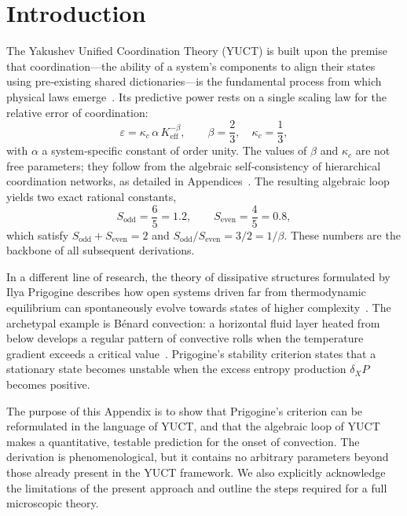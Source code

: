\documentclass[12pt,a4paper]{article}
\begin{document}
	\newpage
	\tableofcontents
	\newpage
	
	\section{Introduction}
	
	The Yakushev Unified Coordination Theory (YUCT) is built upon the premise that coordination—the ability of a system's components to align their states using pre‑existing shared dictionaries—is the fundamental process from which physical laws emerge~\cite{Yakushev2026}.  Its predictive power rests on a single scaling law for the relative error of coordination:
	\begin{equation}\label{eq:universal}
		\varepsilon = \kappa_c\,\alpha\, K_{\mathrm{eff}}^{-\beta},\qquad 
		\beta = \frac{2}{3},\quad \kappa_c = \frac{1}{3},
	\end{equation}
	with \(\alpha\) a system‑specific constant of order unity.  The values of \(\beta\) and \(\kappa_c\) are not free parameters; they follow from the algebraic self‑consistency of hierarchical coordination networks, as detailed in Appendices~\cite{AppendixY, AppendixL, AppendixFerra, AppendixAF}.  The resulting algebraic loop yields two exact rational constants,
	\begin{equation}\label{eq:S-constants}
		S_{\mathrm{odd}} = \frac{6}{5} = 1.2,\qquad
		S_{\mathrm{even}} = \frac{4}{5} = 0.8,
	\end{equation}
	which satisfy \(S_{\mathrm{odd}} + S_{\mathrm{even}} = 2\) and \(S_{\mathrm{odd}}/S_{\mathrm{even}} = 3/2 = 1/\beta\).  These numbers are the backbone of all subsequent derivations.
	
	In a different line of research, the theory of dissipative structures formulated by Ilya Prigogine describes how open systems driven far from thermodynamic equilibrium can spontaneously evolve towards states of higher complexity~\cite{Prigogine1977, Glansdorff1971}.  The archetypal example is B\'{e}nard convection: a horizontal fluid layer heated from below develops a regular pattern of convective rolls when the temperature gradient exceeds a critical value~\cite{Chandrasekhar1961}.  Prigogine's stability criterion states that a stationary state becomes unstable when the excess entropy production \(\delta_X P\) becomes positive.
	
	The purpose of this Appendix is to show that Prigogine's criterion can be reformulated in the language of YUCT, and that the algebraic loop of YUCT makes a quantitative, testable prediction for the onset of convection.  The derivation is phenomenological, but it contains no arbitrary parameters beyond those already present in the YUCT framework.  We also explicitly acknowledge the limitations of the present approach and outline the steps required for a full microscopic theory.
	
\end{document}
